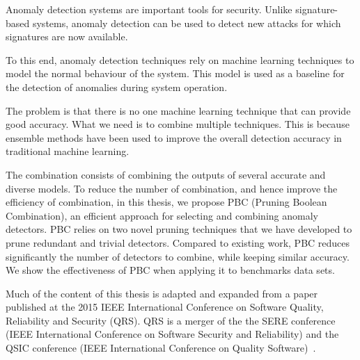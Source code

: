 Anomaly detection systems are important tools for security. Unlike signature-based systems, anomaly detection can be used to detect new attacks for which signatures are now available.

To this end, anomaly detection techniques rely on machine learning techniques to model the normal behaviour of the system. This model is used as a baseline for the detection of anomalies during system operation.

The problem is that there is no one machine learning technique that can provide good accuracy. What we need is to combine multiple techniques. This is because ensemble methods have been used to improve the overall detection accuracy in traditional machine learning. 

The combination consists of combining the outputs of several accurate and diverse models. To reduce the number of combination, and hence improve the efficiency of combination, in this thesis, we propose PBC (Pruning Boolean Combination), an efficient approach for selecting and combining anomaly detectors. PBC relies on two novel pruning techniques that we have developed to  prune redundant and trivial detectors. Compared to existing work, PBC reduces significantly the number of detectors to combine, while keeping similar accuracy. We show the effectiveness of PBC when applying it to benchmarks data sets.

Much of the content of this thesis is adapted and expanded from a paper published at the 2015 IEEE International Conference on Software Quality, Reliability and Security (QRS). QRS is a merger of the the SERE conference (IEEE International Conference on Software Security and Reliability) and the QSIC conference (IEEE International Conference on Quality Software)~\cite{Soudi2015}. 
